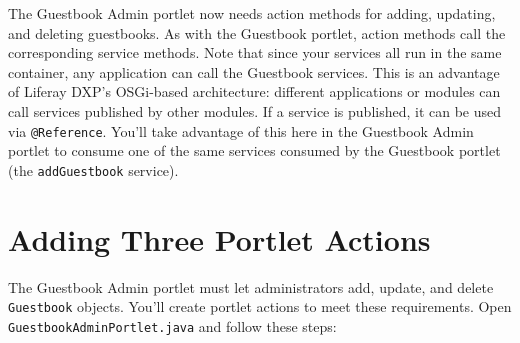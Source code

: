 The Guestbook Admin portlet now needs action methods for adding,
updating, and deleting guestbooks. As with the Guestbook portlet, action
methods call the corresponding service methods. Note that since your
services all run in the same container, any application can call the
Guestbook services. This is an advantage of Liferay DXP's OSGi-based
architecture: different applications or modules can call services
published by other modules. If a service is published, it can be used
via \texttt{@Reference}. You'll take advantage of this here in the
Guestbook Admin portlet to consume one of the same services consumed by
the Guestbook portlet (the \texttt{addGuestbook} service).

\section{Adding Three Portlet
Actions}\label{adding-three-portlet-actions}

The Guestbook Admin portlet must let administrators add, update, and
delete \texttt{Guestbook} objects. You'll create portlet actions to meet
these requirements. Open \texttt{GuestbookAdminPortlet.java} and follow
these steps:

